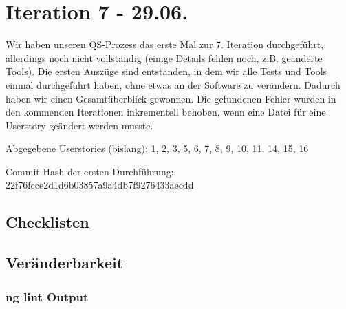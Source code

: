 \section{Iteration 7 - 29.06.}
	Wir haben unseren QS-Prozess das erste Mal zur 7. Iteration durchgeführt, allerdings noch nicht vollständig (einige Details fehlen noch, z.B. geänderte Tools). Die ersten Auszüge sind entstanden, in dem wir alle Tests und Tools einmal durchgeführt haben, ohne etwas an der Software zu verändern. Dadurch haben wir einen Gesamtüberblick gewonnen. Die gefundenen Fehler wurden in den kommenden Iterationen inkrementell behoben, wenn eine Datei für eine Userstory geändert werden musste.
	
	Abgegebene Userstories (bislang): 1, 2, 3, 5, 6, 7, 8, 9, 10, 11, 14, 15, 16
	
	Commit Hash der ersten Durchführung: 22f76fcce2d1d6b03857a9a4db7f9276433aecdd
	
	\subsection{Checklisten}
	
	
	
	
	
	
	
	
	
	
	
	
	
	\subsection{Veränderbarkeit}
	\subsubsection{ng lint Output}
	

